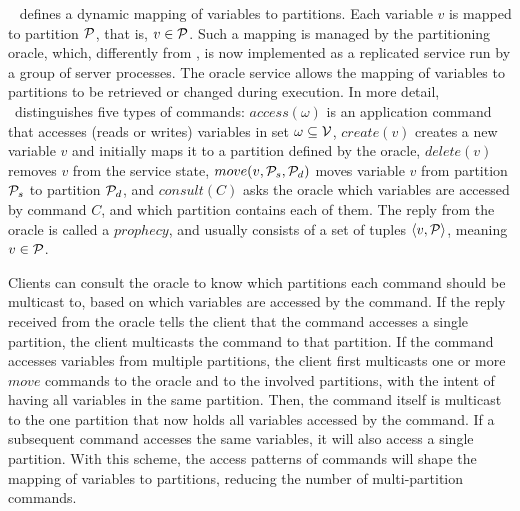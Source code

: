\dssmr{}~\cite{le2016dssmr} defines a dynamic mapping of variables to partitions.
Each variable $v$ is mapped to partition $\mathcal{P}$, that is, $v \in \mathcal{P}$.
Such a mapping is managed by the partitioning oracle, which, differently from \ssmr, is now implemented as a replicated service run by a group of server processes.
The oracle service allows the mapping of variables to partitions to be retrieved or changed during execution.
In more detail, \dssmr\ distinguishes five types of commands:
$access(\omega)$ is an application command that accesses (reads or writes) variables in set $\omega \subseteq \mathcal{V}$,
$create(v)$ creates a new variable $v$ and initially maps it to a partition defined by the oracle,
$delete(v)$ removes $v$ from the service state,
$move(v,\mathcal{P}_s,\mathcal{P}_d)$ moves variable $v$ from partition $\mathcal{P}_s$ to partition $\mathcal{P}_d$,
and $consult(C)$ asks the oracle which variables are accessed by command $C$, and which partition contains each of them.
The reply from the oracle is called a $prophecy$, and usually consists of a set of tuples $\langle v, \mathcal{P} \rangle$, meaning $v \in \mathcal{P}$.


Clients can consult the oracle to know which partitions each command should be multicast to, based on which variables are accessed by the command.
If the reply received from the oracle tells the client that the command accesses a single partition, the client multicasts the command to that partition.
If the command accesses variables from multiple partitions, the client first multicasts one or more $move$ commands to the oracle and to the involved partitions, with the intent of having all variables in the same partition.
Then, the command itself is multicast to the one partition that now holds all variables accessed by the command.
If a subsequent command accesses the same variables, it will also access a single partition.
With this scheme, the access patterns of commands will shape the mapping of variables to partitions, reducing the number of multi-partition commands.

